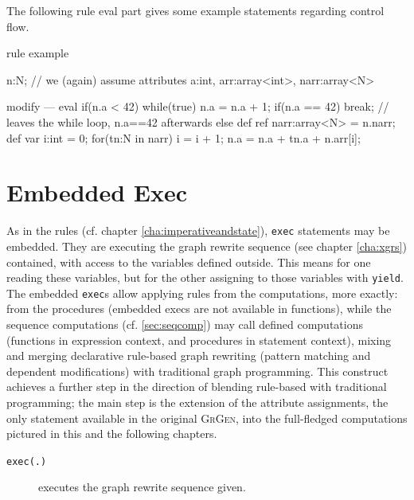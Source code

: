 \begin{example}
The following rule eval part gives some example statements regarding control flow.
  \begin{grgen}
rule example
{
  n:N; // we (again) assume attributes a:int, arr:array<int>, narr:array<N>
	
	modify {
	---
		eval {
			if(n.a < 42) {
				while(true) {
					n.a = n.a + 1;
					if(n.a == 42) {
						break; // leaves the while loop, n.a==42 afterwards
					}
				}
			} else {
				def ref narr:array<N> = n.narr;
				def var i:int = 0;
				for(tn:N in narr) {
					i = i + 1;
					n.a = n.a + tn.a + n.arr[i];
				}
			}
		}
	}
}
  \end{grgen}
\end{example}


\section{Embedded Exec} 

As in the rules (cf. chapter \ref{cha:imperativeandstate}), \texttt{exec} statements may be embedded.
They are executing the graph rewrite sequence (see chapter \ref{cha:xgrs}) contained, with access to the variables defined outside.
This means for one reading these variables, but for the other assigning to those variables with \texttt{yield}.
The embedded \texttt{exec}s allow applying rules from the computations, more exactly: from the procedures (embedded execs are not available in functions), while the sequence computations (cf. \ref{sec:seqcomp}) may call defined computations (functions in expression context, and procedures in statement context), mixing and merging declarative rule-based graph rewriting (pattern matching and dependent modifications) with traditional graph programming.
This construct achieves a further step in the direction of blending rule-based with traditional programming; the main step is the extension of the attribute assignments, the only statement available in the original {\scshape GrGen}, into the full-fledged computations pictured in this and the following chapters.

\begin{description}
\item[\texttt{exec(.)}] executes the graph rewrite sequence given. 
\end{description}



